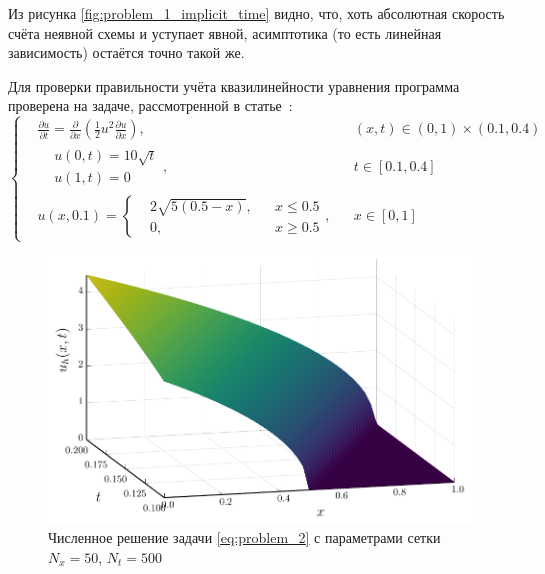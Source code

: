 Из рисунка \ref{fig:problem_1_implicit_time} видно, что, хоть абсолютная скорость счёта неявной схемы и уступает явной, асимптотика (то есть линейная зависимость) остаётся точно такой же.


Для проверки правильности учёта квазилинейности уравнения программа проверена на задаче, рассмотренной в статье~\cite{самарский1963примеры}:
\begin{equation*}
    \left\{
        \begin{aligned}
            &\frac{\partial u}{\partial t} = \frac{\partial }{\partial x}\left( \frac{1}{2}u^2 \frac{\partial u}{\partial x} \right), && (x, t) \in (0, 1)\times(0.1, 0.4)\\
            &\begin{aligned}
            &u(0, t) = 10\sqrt{t}\\
            &u(1, t) = 0
            \end{aligned}, && t\in [0.1, 0.4]\\
            &u(x, 0.1) = \left\{ \begin{aligned}
                &2\sqrt{5(0.5 - x)}, && x \le 0.5\\
                & 0, && x\ge 0.5
            \end{aligned}\right. , && x \in [0, 1]
        \end{aligned}
    \right.
\end{equation*}
\begin{figure}
    \centering
    \includegraphics{Разностные_схемы_на_статических_сетках/Программный_код_примеры_расчётов/explicit_scheme/problem_2_implicit_surface.pdf}
    \caption{Численное решение задачи \eqref{eq:problem_2} с параметрами сетки $N_x = 50$, $N_t = 500$}
    \label{fig:problem_2_implicit_surface}
\end{figure}
